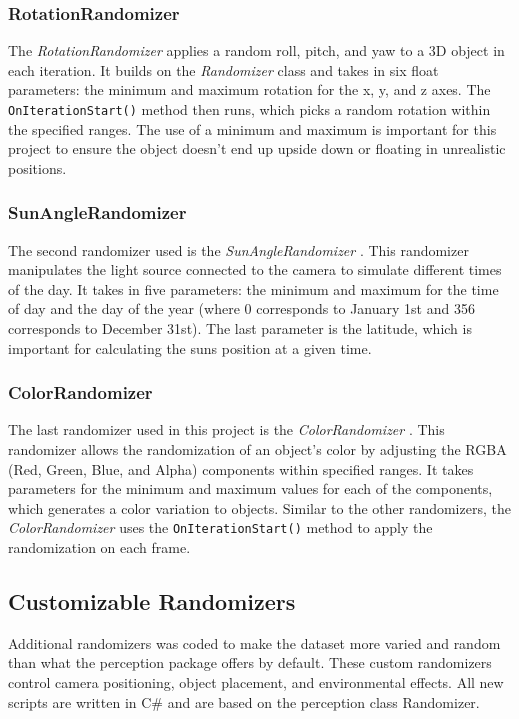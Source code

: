 \subsubsection{RotationRandomizer}
The \textit{RotationRandomizer} \cite{rotation_randomizer} applies a random roll, pitch, and yaw to a 3D object in each iteration. It builds on the \textit{Randomizer} class and takes in six float parameters: the minimum and maximum rotation for the x, y, and z axes. The \texttt{OnIterationStart()} method then runs, which picks a random rotation within the specified ranges. The use of a minimum and maximum is important for this project to ensure the object doesn’t end up upside down or floating in unrealistic positions.

\subsubsection{SunAngleRandomizer}
The second randomizer used is the \textit{SunAngleRandomizer} \cite{sun_angle_randomizer}. This randomizer manipulates the light source connected to the camera to simulate different times of the day. It takes in five parameters: the minimum and maximum for the time of day and the day of the year (where 0 corresponds to January 1st and 356 corresponds to December 31st). The last parameter is the latitude, which is important for calculating the suns position at a given time.

\subsubsection{ColorRandomizer}
The last randomizer used in this project is the \textit{ColorRandomizer} \cite{color_randomizer}. This randomizer allows the randomization of an object's color by adjusting the RGBA (Red, Green, Blue, and Alpha) components within specified ranges. It takes parameters for the minimum and maximum values for each of the components, which generates a color variation to objects. Similar to the other randomizers, the \textit{ColorRandomizer} uses the \texttt{OnIterationStart()} method to apply the randomization on each frame.


\subsection{Customizable Randomizers}
Additional randomizers was coded to make the dataset more varied and random than what the perception package offers by default. These custom randomizers control camera positioning, object placement, and environmental effects. All new scripts are written in C\# and are based on the perception class Randomizer.

